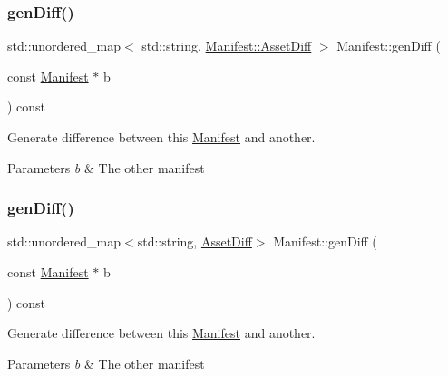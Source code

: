 \subsubsection{\texorpdfstring{gen\+Diff()}{genDiff()}\hspace{0.1cm}{\footnotesize\ttfamily [1/2]}}
{\footnotesize\ttfamily std\+::unordered\+\_\+map$<$ std\+::string, \hyperlink{structManifest_1_1AssetDiff}{Manifest\+::\+Asset\+Diff} $>$ Manifest\+::gen\+Diff (\begin{DoxyParamCaption}\item[{const \hyperlink{classManifest}{Manifest} $\ast$}]{b }\end{DoxyParamCaption}) const\hspace{0.3cm}{\ttfamily [protected]}}



Generate difference between this \hyperlink{classManifest}{Manifest} and another. 


\begin{DoxyParams}{Parameters}
{\em b} & The other manifest \\
\hline
\end{DoxyParams}
\mbox{\label{classManifest_ae66cde752346c80a004ec637cf394b5f}} 
\subsubsection{\texorpdfstring{gen\+Diff()}{genDiff()}\hspace{0.1cm}{\footnotesize\ttfamily [2/2]}}
{\footnotesize\ttfamily std\+::unordered\+\_\+map$<$std\+::string, \hyperlink{structManifest_1_1AssetDiff}{Asset\+Diff}$>$ Manifest\+::gen\+Diff (\begin{DoxyParamCaption}\item[{const \hyperlink{classManifest}{Manifest} $\ast$}]{b }\end{DoxyParamCaption}) const\hspace{0.3cm}{\ttfamily [protected]}}



Generate difference between this \hyperlink{classManifest}{Manifest} and another. 


\begin{DoxyParams}{Parameters}
{\em b} & The other manifest \\
\hline
\end{DoxyParams}
\mbox{\label{classManifest_a864bd328575f36a37733ab13ba5e5df0}} 
